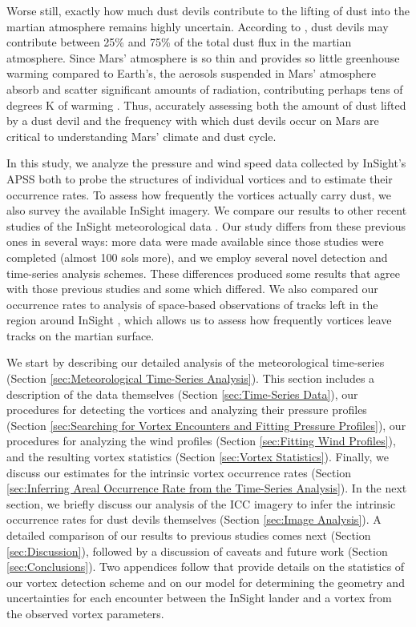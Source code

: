 \documentclass[linenumbers,trackchanges]{aastex63}
\begin{document}
Worse still, exactly how much dust devils contribute to the lifting of dust into the martian atmosphere remains highly uncertain. According to \citet{2016SSRv..203...89F}, dust devils may contribute between 25\% and 75\% of the total dust flux in the martian atmosphere. Since Mars' atmosphere is so thin and provides so little greenhouse warming compared to Earth's, the aerosols suspended in Mars' atmosphere absorb and scatter significant amounts of radiation, contributing perhaps tens of degrees K of warming \citep{2002Icar..157..259S, 2004JGRE..10911006B}. Thus, accurately assessing both the amount of dust lifted by a dust devil and the frequency with which dust devils occur on Mars are critical to understanding Mars' climate and dust cycle.

In this study, we analyze the pressure and wind speed data collected by InSight's APSS both to probe the structures of individual vortices and to estimate their occurrence rates. To assess how frequently the vortices actually carry dust, we also survey the available InSight imagery. We compare our results to other recent studies of the InSight meteorological data \citep{2021Icar..35514119L, Spiga2021}. Our study differs from these previous ones in several ways: more data were made available since those studies were completed (almost 100 sols more), and we employ several novel detection and time-series analysis schemes. These differences produced some results that agree with those previous studies and some which differed. We also compared our occurrence rates to analysis of space-based observations of tracks left in the region around InSight \citep{2016Icar..266..315R, 2020GeoRL..4787234P}, which allows us to assess how frequently vortices leave tracks on the martian surface. 

We start by describing our detailed analysis of the meteorological time-series (Section \ref{sec:Meteorological Time-Series Analysis}). This section includes a description of the data themselves (Section \ref{sec:Time-Series Data}), our procedures for detecting the vortices and analyzing their pressure profiles (Section \ref{sec:Searching for Vortex Encounters and Fitting Pressure Profiles}), our procedures for analyzing the wind profiles (Section \ref{sec:Fitting Wind Profiles}), and the resulting vortex statistics (Section \ref{sec:Vortex Statistics}). Finally,  we discuss our estimates for the intrinsic vortex occurrence rates (Section \ref{sec:Inferring Areal Occurrence Rate from the Time-Series Analysis}). In the next section, we briefly discuss our analysis of the ICC imagery to infer the intrinsic occurrence rates for dust devils themselves (Section \ref{sec:Image Analysis}). A detailed comparison of our results to previous studies comes next (Section \ref{sec:Discussion}), followed by a discussion of caveats and future work (Section \ref{sec:Conclusions}). Two appendices follow that provide details on the statistics of our vortex detection scheme and on our model for determining the geometry and uncertainties for each encounter between the InSight lander and a vortex from the observed vortex parameters. 
\end{document}
